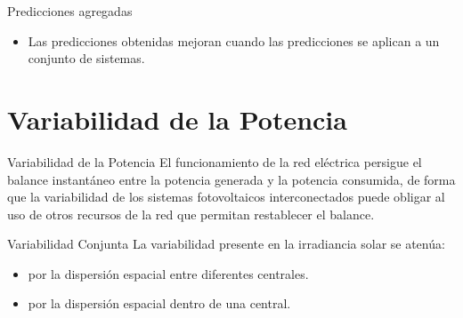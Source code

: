 \documentclass[aspectratio=169, usenames,svgnames,dvipsnames]{beamer}
\begin{document}
\begin{frame}[label={sec:org96e92a9}]{Predicciones agregadas}
\begin{itemize}
\item Las predicciones obtenidas mejoran cuando las predicciones se
aplican a un conjunto de sistemas.
\end{itemize}
\end{frame}

\section{Variabilidad de la Potencia}
\label{sec:org1aa2668}

\begin{frame}[label={sec:org1d85f84}]{Variabilidad de la Potencia}
El funcionamiento de la red eléctrica persigue el balance instantáneo
  entre la potencia generada y la potencia consumida, de forma que la
  variabilidad de los sistemas fotovoltaicos interconectados puede
  obligar al uso de otros recursos de la red que permitan restablecer
  el balance.
\end{frame}
\begin{frame}[label={sec:org9ea15e7}]{Variabilidad Conjunta}
La variabilidad presente en la irradiancia solar se atenúa:
\begin{itemize}
\item por la dispersión espacial entre diferentes centrales.
\item por la dispersión espacial dentro de una central.
\end{itemize}
\end{frame}
\end{document}
